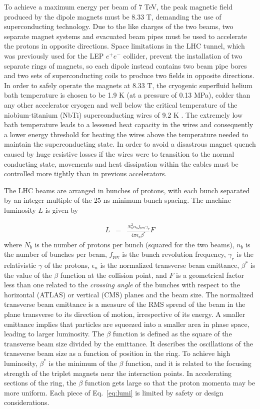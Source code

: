 \documentclass[dissertation.tex]{subfiles}
\begin{document}
To achieve a maximum energy per beam of 7 TeV, the peak magnetic field produced by the dipole magnets must be 8.33 T, demanding the use of superconducting technology.  Due to the like charges of the two beams, two separate magnet systems and evacuated beam pipes must be used to accelerate the protons in opposite directions.  Space limitations in the LHC tunnel, which was previously used for the LEP $e^{+}e^{-}$ collider, prevent the installation of two separate rings of magnets, so each dipole instead contains two beam pipe bores and two sets of superconducting coils to produce two fields in opposite directions.  In order to safely operate the magnets at 8.33 T, the cryogenic superfluid helium bath temperature is chosen to be 1.9 K (at a pressure of 0.13 MPa), colder than any other accelerator cryogen and well below the critical temperature of the niobium-titanium (NbTi) superconducting wires of 9.2 K \cite{Flukiger}.  The extremely low bath temperature leads to a lessened heat capacity in the wires and consequently a lower energy threshold for heating the wires above the temperature needed to maintain the superconducting state.  In order to avoid a disastrous magnet quench caused by huge resistive losses if the wires were to transition to the normal conducting state, movements and heat dissipation within the cables must be controlled more tightly than in previous accelerators.

The LHC beams are arranged in bunches of protons, with each bunch separated by an integer multiple of the 25 ns minimum bunch spacing.  The machine luminosity $L$ is given by

\begin{eqnarray}
L &=& \frac{N_{b}^{2}n_{b}f_{\mathrm{rev}}\gamma_{r}}{4\pi\epsilon_{n}\beta^{*}}F
\label{eq:lumi}
\end{eqnarray}
%
where $N_{b}$ is the number of protons per bunch (squared for the two beams), $n_{b}$ is the number of bunches per beam, $f_{\mathrm{rev}}$ is the bunch revolution frequency, $\gamma_{r}$ is the relativistic $\gamma$ of the protons, $\epsilon_{n}$ is the normalized transverse beam emittance, $\beta^{*}$ is the value of the $\beta$ function at the collision point, and $F$ is a geometrical factor less than one related to the \textit{crossing angle} of the bunches with respect to the horizontal (ATLAS) or vertical (CMS) planes and the beam size.  The normalized transverse beam emittance is a measure of the RMS spread of the beam in the plane transverse to its direction of motion, irrespective of its energy.  A smaller emittance implies that particles are squeezed into a smaller area in phase space, leading to larger luminosity.  The $\beta$ function is defined as the square of the transverse beam size divided by the emittance.  It describes the oscillations of the transverse beam size as a function of position in the ring.  To achieve high luminosity, $\beta^{*}$ is the minimum of the $\beta$ function, and it is related to the focusing strength of the triplet magnets near the interaction points.  In accelerating sections of the ring, the $\beta$ function gets large so that the proton momenta may be more uniform.  Each piece of Eq.~\ref{eq:lumi} is limited by safety or design considerations.
\end{document}
